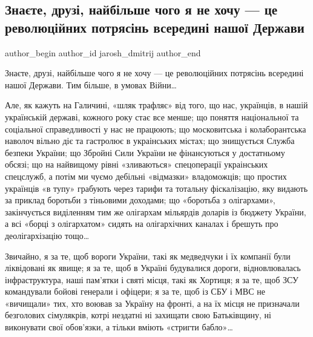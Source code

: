  
 
 
 
 
 
\subsection{Знаєте, друзі, найбільше чого я не хочу — це революційних потрясінь всередині нашої Держави}
\label{sec:11_09_2021.fb.jarosh_dmitrij.1.revolucia_ukraina}
 
\ifcmt
 author_begin
   author_id jarosh_dmitrij
 author_end
\fi

Знаєте, друзі, найбільше чого я не хочу — це революційних потрясінь всередині
нашої Держави. Тим більше, в умовах Війни…

Але, як кажуть на Галичині, «шляк трафляє» від того, що нас, українців, в нашій
українській державі, кожного року стає все менше; що поняття національної та
соціальної справедливості у нас не працюють; що московитська і колаборантська
наволоч вільно діє та гастролює в украінських містах; що знищується Служба
безпеки України; що Збройні Сили України не фінансуються у достатньому обсязі;
що на найвищому рівні «зливаються» спецоперації украінських спецслужб, а потім
ми чуємо дебільні «відмазки» владоможців; що простих українців «в тупу»
грабують через тарифи та тотальну фіскалізацію, яку видають за приклад боротьби
з тіньовими доходами; що «боротьба з олігархами», закінчується виділенням тим
же олігархам мільярдів доларів із бюджету України, а всі «борці з олігархатом»
сидять на олігархічних каналах і брешуть про деолігархізацію тощо…

Звичайно, я за те, щоб вороги України, такі як медведчуки і їх компанії були
ліквідовані як явище; я за те, щоб в Україні будувалися дороги, відновлювалась
інфраструктура, наші пам’ятки і святі місця, такі як Хортиця; я за те, щоб ЗСУ
командували бойові генерали і офіцери; я за те, щоб із СБУ і МВС не «вичищали»
тих, хто воював за Україну на фронті, а на їх місця не призначали безголових
сімулякрів, котрі нездатні ні захищати свою Батьківщину, ні виконувати свої
обов’язки, а тільки вміють «стригти бабло»…

